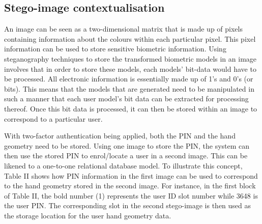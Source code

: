 \subsection{Stego-image contextualisation}

An image can be seen as a two-dimensional matrix that is made up of pixels containing information about the colours within each particular pixel. This pixel information can be used to store sensitive biometric information. Using steganography techniques to store the transformed biometric models in an image involves that in order to store these models, each models’ bit-data would have to be processed. All electronic information is essentially made up of 1’s and 0’s (or bits). This means that the models that are generated need to be manipulated in such a manner that each user model’s bit data can be extracted for processing thereof. Once this bit data is processed, it can then be stored within an image to correspond to a particular user. 

With two-factor authentication being applied, both the PIN and the hand geometry need to be stored. Using one image to store the PIN, the system can then use the stored PIN to enrol/locate a user in a second image. This can be likened to a one-to-one relational database model. To illustrate this concept, Table II shows how PIN information in the first image can be used to correspond to the hand geometry stored in the second image. For instance, in the first block of Table II, the bold number (1) represents the user ID slot number while 3648 is the user PIN. The corresponding slot in the second stego-image is then used as the storage location for the user hand geometry data.



